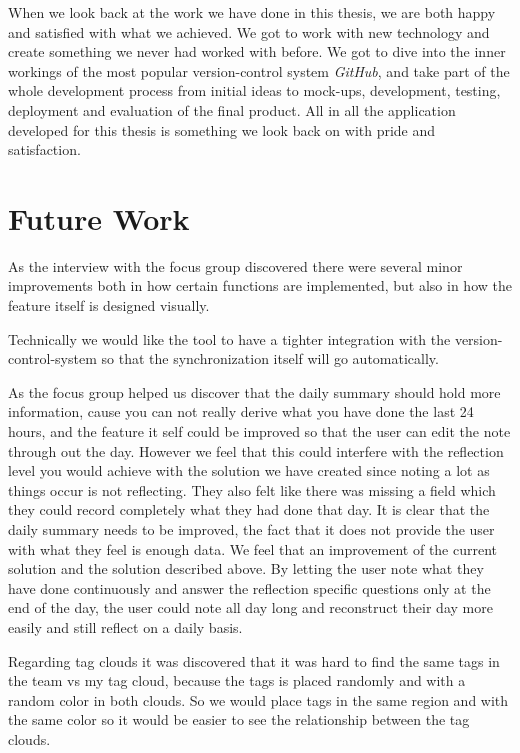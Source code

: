 When we look back at the work we have done in this thesis, we are both happy and satisfied with what we achieved. We got to work with new technology and create something we never had worked with before. We got to dive into the inner workings of the most popular version-control system \emph{GitHub}, and take part of the whole development process from initial ideas to mock-ups, development, testing, deployment and evaluation of the final product. All in all the application developed for this thesis is something we look back on with pride and satisfaction. 

\section{Future Work}
As the interview with the focus group discovered there were several minor improvements both in how certain functions are implemented, but also in how the feature itself is designed visually. 

Technically we would like the tool to have a tighter integration with the version-control-system so that the synchronization itself will go automatically.

As the focus group helped us discover that the daily summary should hold more information, cause you can not really derive what you have done the last 24 hours, and the feature it self could be improved so that the user can edit the note through out the day. However we feel that this could interfere with the reflection level you would achieve with the solution we have created since noting a lot as things occur is not reflecting. They also felt like there was missing a field which they could record completely what they had done that day. It is clear that the daily summary needs to be improved, the fact that it does not provide the user with what they feel is enough data. We feel that an improvement of the current solution and the solution described above. By letting the user note what they have done continuously and answer the reflection specific questions only at the end of the day, the user could note all day long and reconstruct their day more easily and still reflect on a daily basis.

Regarding tag clouds it was discovered that it was hard to find the same tags in the team vs my tag cloud, because the tags is placed randomly and with a random color in both clouds. So we would place tags in the same region and with the same color so it would be  easier to see the relationship between the tag clouds.

